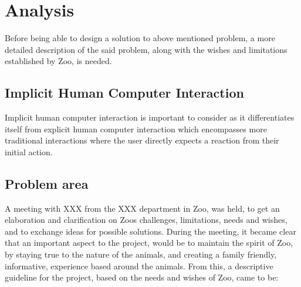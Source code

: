 \chapter{Analysis}\label{chap:analysis}
Before being able to design a solution to above mentioned problem, a more detailed description of the said problem, along with the wishes and limitations established by Zoo, is needed. 

\section{Implicit Human Computer Interaction}

Implicit human computer interaction is important to consider as it differentiates itself from explicit human computer interaction which encompasses more traditional interactions where the user directly expects a reaction from their initial action.

\section{Problem area}
A meeting with XXX from the XXX department in Zoo, was held, to get an elaboration and clarification on Zoos challenges, limitations, needs and wishes, and to exchange ideas for possible solutions. During the meeting, it became clear that an important aspect to the project, would be to maintain the spirit of Zoo, by staying true to the nature of the animals, and creating a family friendly, informative, experience based around the animals. 
From this, a descriptive guideline for the project, based on the needs and wishes of Zoo, came to be:  

